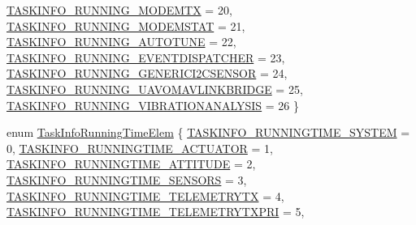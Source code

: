 \begin{DoxyCompactItemize}
\*
\hyperlink{group___task_info_gga772847398b4ab66cab9a93abec0b55b7aa133fb24a4caea134a941fc833051a27}{\-T\-A\-S\-K\-I\-N\-F\-O\-\_\-\-R\-U\-N\-N\-I\-N\-G\-\_\-\-M\-O\-D\-E\-M\-T\-X} = 20, 
\hyperlink{group___task_info_gga772847398b4ab66cab9a93abec0b55b7a24ba37f0dbc9b17aca8b6519923b5faa}{\-T\-A\-S\-K\-I\-N\-F\-O\-\_\-\-R\-U\-N\-N\-I\-N\-G\-\_\-\-M\-O\-D\-E\-M\-S\-T\-A\-T} = 21, 
\hyperlink{group___task_info_gga772847398b4ab66cab9a93abec0b55b7a0245c2718721361deb6e59ae457b0038}{\-T\-A\-S\-K\-I\-N\-F\-O\-\_\-\-R\-U\-N\-N\-I\-N\-G\-\_\-\-A\-U\-T\-O\-T\-U\-N\-E} = 22, 
\hyperlink{group___task_info_gga772847398b4ab66cab9a93abec0b55b7aecb567238c2bf51a8a74ef1f128853a1}{\-T\-A\-S\-K\-I\-N\-F\-O\-\_\-\-R\-U\-N\-N\-I\-N\-G\-\_\-\-E\-V\-E\-N\-T\-D\-I\-S\-P\-A\-T\-C\-H\-E\-R} = 23, 
\*
\hyperlink{group___task_info_gga772847398b4ab66cab9a93abec0b55b7a1df1edd1f428f2e1e666f978379b1933}{\-T\-A\-S\-K\-I\-N\-F\-O\-\_\-\-R\-U\-N\-N\-I\-N\-G\-\_\-\-G\-E\-N\-E\-R\-I\-C\-I2\-C\-S\-E\-N\-S\-O\-R} = 24, 
\hyperlink{group___task_info_gga772847398b4ab66cab9a93abec0b55b7a9e3e41ef94b0990625dc41b2d374dd45}{\-T\-A\-S\-K\-I\-N\-F\-O\-\_\-\-R\-U\-N\-N\-I\-N\-G\-\_\-\-U\-A\-V\-O\-M\-A\-V\-L\-I\-N\-K\-B\-R\-I\-D\-G\-E} = 25, 
\hyperlink{group___task_info_gga772847398b4ab66cab9a93abec0b55b7ac9813b3a02c257db8a96f53afb0fb065}{\-T\-A\-S\-K\-I\-N\-F\-O\-\_\-\-R\-U\-N\-N\-I\-N\-G\-\_\-\-V\-I\-B\-R\-A\-T\-I\-O\-N\-A\-N\-A\-L\-Y\-S\-I\-S} = 26
 \}
\item 
enum \hyperlink{group___task_info_ga1aa9b46f6fac0448876b45788f837db6}{\-Task\-Info\-Running\-Time\-Elem} \{ \*
\hyperlink{group___task_info_gga1aa9b46f6fac0448876b45788f837db6ac2fb03f968e58b90da2e6fe34f03d796}{\-T\-A\-S\-K\-I\-N\-F\-O\-\_\-\-R\-U\-N\-N\-I\-N\-G\-T\-I\-M\-E\-\_\-\-S\-Y\-S\-T\-E\-M} = 0, 
\hyperlink{group___task_info_gga1aa9b46f6fac0448876b45788f837db6a0c77eae25b3e7e336bb53d22eb201910}{\-T\-A\-S\-K\-I\-N\-F\-O\-\_\-\-R\-U\-N\-N\-I\-N\-G\-T\-I\-M\-E\-\_\-\-A\-C\-T\-U\-A\-T\-O\-R} = 1, 
\hyperlink{group___task_info_gga1aa9b46f6fac0448876b45788f837db6af7d72b2c0fcfa01089cace9c07e46641}{\-T\-A\-S\-K\-I\-N\-F\-O\-\_\-\-R\-U\-N\-N\-I\-N\-G\-T\-I\-M\-E\-\_\-\-A\-T\-T\-I\-T\-U\-D\-E} = 2, 
\hyperlink{group___task_info_gga1aa9b46f6fac0448876b45788f837db6a912c7bd0ad7bdb4eecda2c2f5a3215d7}{\-T\-A\-S\-K\-I\-N\-F\-O\-\_\-\-R\-U\-N\-N\-I\-N\-G\-T\-I\-M\-E\-\_\-\-S\-E\-N\-S\-O\-R\-S} = 3, 
\*
\hyperlink{group___task_info_gga1aa9b46f6fac0448876b45788f837db6afc18fec348bbb0253fabc662da6ea168}{\-T\-A\-S\-K\-I\-N\-F\-O\-\_\-\-R\-U\-N\-N\-I\-N\-G\-T\-I\-M\-E\-\_\-\-T\-E\-L\-E\-M\-E\-T\-R\-Y\-T\-X} = 4, 
\hyperlink{group___task_info_gga1aa9b46f6fac0448876b45788f837db6a0f75fa7497ca0fad3aefb5e1277a55ee}{\-T\-A\-S\-K\-I\-N\-F\-O\-\_\-\-R\-U\-N\-N\-I\-N\-G\-T\-I\-M\-E\-\_\-\-T\-E\-L\-E\-M\-E\-T\-R\-Y\-T\-X\-P\-R\-I} = 5, 

\end{DoxyCompactItemize}
